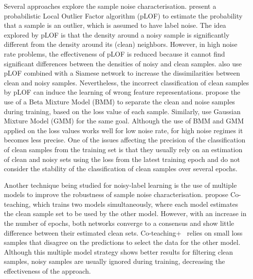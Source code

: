 \documentclass{article}
\begin{document}
Several approaches explore the sample noise characterisation. \citet{xue2019robust} present a probabilistic Local Outlier Factor algorithm (pLOF) to estimate the probability that a sample is an outlier, which is assumed to have label noise. The idea explored by pLOF is that the density around a noisy sample is significantly different from the density around its (clean) neighbors. However, in high noise rate problems, the effectiveness of pLOF is reduced because it cannot find significant differences between the densities of noisy and clean samples. 
\citet{wang2018iterative} also use pLOF combined with a Siamese network to increase the dissimilarities between clean and noisy samples. Nevertheless, the incorrect classification of clean samples by pLOF can induce the learning of wrong feature representations. \citet{arazo2019unsupervised} propose the use of a Beta Mixture Model (BMM) to separate the clean and noise samples during training, based on the loss value of each sample. 
Similarly, \citet{li2020dividemix} use Gaussian Mixture Model (GMM) for the same goal.
Although the use of BMM and GMM applied on the loss values works well for low noise rate, for high noise regimes it becomes less precise. One of the issues affecting the precision of the classification of clean samples from the training set is that they usually rely on an estimation of clean and noisy sets using the loss from the latest training epoch and do not consider the stability of the classification of clean samples over several epochs.

Another technique being studied for noisy-label learning is the use of multiple models to improve the robustness of sample noise characterisation. \citet{han2018co} propose Co-teaching, which trains two models simultaneously, where each model estimates the clean sample set to be used by the other model. However, with an increase in the number of epochs, both networks converge to a consensus and show little difference between their estimated clean sets. Co-teaching+~\cite{yu2019does} relies on small loss samples that disagree on the predictions to select the data for the other model. Although this multiple model strategy shows better results for filtering clean samples, noisy samples are usually ignored during training, decreasing the effectiveness of the approach.
\end{document}
